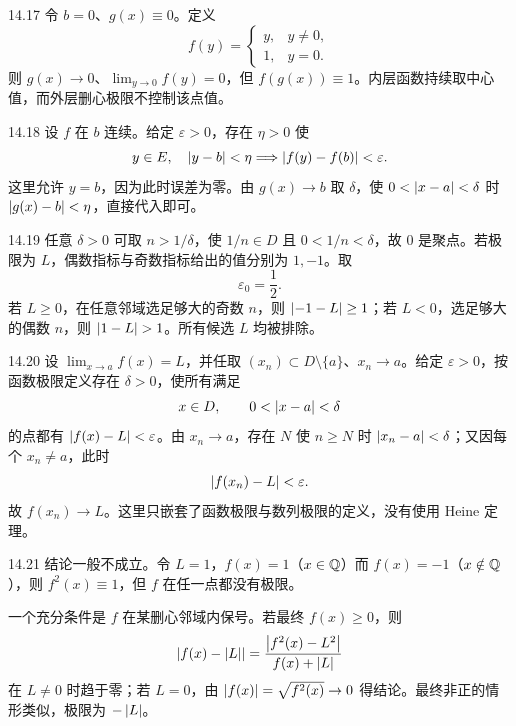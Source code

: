 \begin{solution}{14.17}
令 \(b=0\)、\(g(x)\equiv0\)。定义
\[
 f(y)=
 \begin{cases}
 y,&y\ne0,\\
 1,&y=0.
 \end{cases}
\]
则 \(g(x)\to0\)、\(\lim_{y\to0}f(y)=0\)，但 \(f(g(x))\equiv1\)。内层函数持续取中心值，而外层删心极限不控制该点值。
\end{solution}

\begin{solution}{14.18}
设 \(f\) 在 \(b\) 连续。给定 \(\varepsilon>0\)，存在 \(\eta>0\) 使
\[
 y\in E,\quad\left|y-b\right|<\eta
 \Longrightarrow\left|f(y)-f(b)\right|<\varepsilon.
\]
这里允许 \(y=b\)，因为此时误差为零。由 \(g(x)\to b\) 取 \(\delta\)，使 \(0<\left|x-a\right|<\delta\) 时 \(\left|g(x)-b\right|<\eta\)，直接代入即可。
\end{solution}

\begin{solution}{14.19}
任意 \(\delta>0\) 可取 \(n>1/\delta\)，使 \(1/n\in D\) 且 \(0<1/n<\delta\)，故 \(0\) 是聚点。若极限为 \(L\)，偶数指标与奇数指标给出的值分别为 \(1,-1\)。取
\[
 \varepsilon_0=\frac12.
\]
若 \(L\ge0\)，在任意邻域选足够大的奇数 \(n\)，则 \(\left|-1-L\right|\ge1\)；若 \(L<0\)，选足够大的偶数 \(n\)，则 \(\abs{1-L}>1\)。所有候选 \(L\) 均被排除。
\end{solution}

\begin{solution}{14.20}
设 \(\lim_{x\to a}f(x)=L\)，并任取 \((x_n)\subset D\setminus\{a\}\)、\(x_n\to a\)。给定 \(\varepsilon>0\)，按函数极限定义存在 \(\delta>0\)，使所有满足
\[
 x\in D,\qquad0<\left|x-a\right|<\delta
\]
的点都有 \(\left|f(x)-L\right|<\varepsilon\)。由 \(x_n\to a\)，存在 \(N\) 使 \(n\ge N\) 时 \(\left|x_n-a\right|<\delta\)；又因每个 \(x_n\ne a\)，此时
\[
 \left|f(x_n)-L\right|<\varepsilon.
\]
故 \(f(x_n)\to L\)。这里只嵌套了函数极限与数列极限的定义，没有使用 Heine 定理。
\end{solution}

\begin{solution}{14.21}
结论一般不成立。令 \(L=1\)，\(f(x)=1\)（\(x\in\mathbb{Q}\)）而 \(f(x)=-1\)（\(x\notin\mathbb{Q}\)），则 \(f^2(x)\equiv1\)，但 \(f\) 在任一点都没有极限。

一个充分条件是 \(f\) 在某删心邻域内保号。若最终 \(f(x)\ge0\)，则
\[
 \left|f(x)-\left|L\right|\right|
 =\frac{\left|f^2(x)-L^2\right|}{f(x)+\left|L\right|}
\]
在 \(L\ne0\) 时趋于零；若 \(L=0\)，由 \(\left|f(x)\right|=\sqrt{f^2(x)}\to0\) 得结论。最终非正的情形类似，极限为 \(-\left|L\right|\)。
\end{solution}

